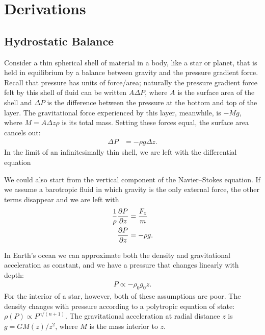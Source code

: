\renewcommand{\chaptername}{Appendix}
\renewcommand{\thechapter}{A} %


\chapter{Derivations}


\section{Hydrostatic Balance} \label{sec:derivation-hydrostatic-balance}
Consider a thin spherical shell of material in a body, like a star or planet, that is held in equilibrium by a balance between gravity and the pressure gradient force. Recall that pressure has units of force/area; naturally the pressure gradient force felt by this shell of fluid can be written $A \Delta P$, where $A$ is the surface area of the shell and $\Delta P$ is the difference between the pressure at the bottom and top of the layer. The gravitational force experienced by this layer, meanwhile, is $-M g$, where $M = A \Delta z \rho$ is its total mass. Setting these forces equal, the surface area cancels out:
\begin{align}
    \Delta P &= -\rho g \Delta z.
\end{align}
In the limit of an infinitesimally thin shell, we are left with the differential equation

We could also start from the vertical component of the Navier--Stokes equation. If we assume a barotropic fluid in which gravity is the only external force, the other terms disappear and we are left with
\begin{align}
    \frac{1}{\rho} \pdv{P}{z} &= \frac{F_z}{m} \\
    \pdv{P}{z} &= -\rho g.
\end{align}

In Earth's ocean we can approximate both the density and gravitational acceleration as constant, and we have a pressure that changes linearly with depth:
\begin{align}
    P \propto -\rho_0 g_0 z.
\end{align}
For the interior of a star, however, both of these assumptions are poor. The density changes with pressure according to a polytropic equation of state: $\rho(P) \propto P^{n/(n+1)}$. The gravitational acceleration at radial distance $z$ is $g = G M(z) / z^2$, where $M$ is the mass interior to $z$.


